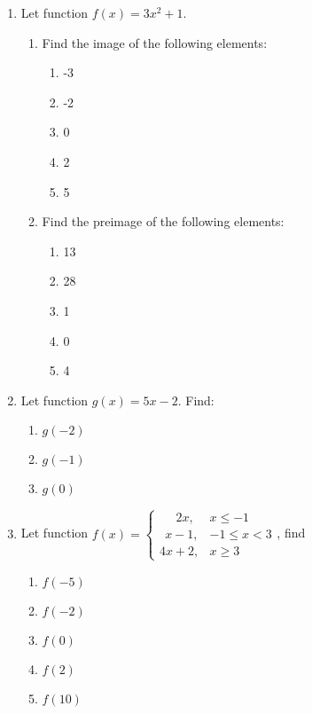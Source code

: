 \documentclass[12pt]{report}
\begin{document}
\begin{multicols}{2}
\begin{enumerate}
    \item Let function $f(x) = 3x^2 + 1$.
          \begin{enumerate}
            \item Find the image of the following elements:
                  \begin{enumerate}
                    \item -3
                    \item -2
                    \item 0
                    \item 2
                    \item 5
                  \end{enumerate}
            \item Find the preimage of the following elements:
                  \begin{enumerate}
                    \item 13
                    \item 28
                    \item 1
                    \item 0
                    \item 4
                  \end{enumerate}
          \end{enumerate}

    \item Let function $g(x) = 5x-2$. Find:
          \begin{enumerate}
            \item $g(-2)$
            \item $g(-1)$
            \item $g(0)$
          \end{enumerate}

    \item Let function $f(x) = \left\{\begin{array}{ll}
              \ \ \ \ \ \ 2x, & x \leq -1     \\
              \ \ x-1,        & -1 \leq x < 3 \\
              4x + 2,         & x \geq 3
            \end{array}\right.$, find

          \begin{enumerate}
            \item $f(-5)$
            \item $f(-2)$
            \item $f(0)$
            \item $f(2)$
            \item $f(10)$
          \end{enumerate}


\end{enumerate}
\end{multicols}
\end{document}
